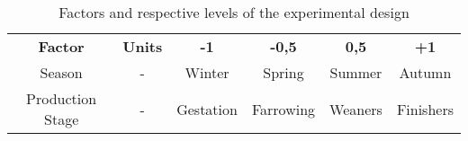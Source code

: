 \begin{table}[]
\centering
\caption{Factors and respective levels of the experimental design}
\label{my-label}
\begin{tabular}{cccccc}
\textbf{Factor}  & \textbf{Units} & \textbf{-1} & \textbf{-0,5} & \textbf{0,5} & \textbf{+1} \\
Season           & -              & Winter      & Spring        & Summer       & Autumn      \\
Production Stage & -              & Gestation   & Farrowing     & Weaners      & Finishers  
\end{tabular}
\end{table}